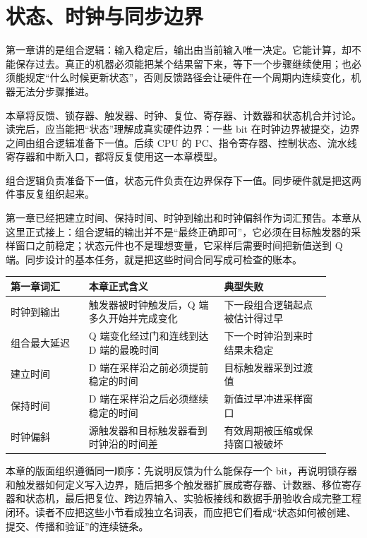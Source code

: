 \chapter{状态、时钟与同步边界}

第一章讲的是组合逻辑：输入稳定后，输出由当前输入唯一决定。它能计算，却不能保存过去。真正的机器必须能把某个结果留下来，等下一个步骤继续使用；也必须能规定“什么时候更新状态”，否则反馈路径会让硬件在一个周期内连续变化，机器无法分步骤推进。

本章将反馈、锁存器、触发器、时钟、复位、寄存器、计数器和状态机合并讨论。读完后，应当能把“状态”理解成真实硬件边界：一些 bit 在时钟边界被提交，边界之间由组合逻辑准备下一值。后续 CPU 的 PC、指令寄存器、控制状态、流水线寄存器和中断入口，都将反复使用这一本章模型。

\begin{keyidea}
组合逻辑负责准备下一值，状态元件负责在边界保存下一值。同步硬件就是把这两件事反复组织起来。
\end{keyidea}

第一章已经把建立时间、保持时间、时钟到输出和时钟偏斜作为词汇预告。本章从这里正式接上：组合逻辑的输出并不是“最终正确即可”，它必须在目标触发器的采样窗口之前稳定；状态元件也不是理想变量，它采样后需要时间把新值送到 Q 端。同步设计的基本任务，就是把这些时间合同写成可检查的账本。

\begin{longtable}{L{0.22\linewidth}L{0.38\linewidth}L{0.3\linewidth}}
\toprule
第一章词汇 & 本章正式含义 & 典型失败 \\
\midrule
时钟到输出 & 触发器被时钟触发后，Q 端多久开始并完成变化 & 下一段组合逻辑起点被估计得过早 \\
组合最大延迟 & Q 端变化经过门和连线到达 D 端的最晚时间 & 下一个时钟沿到来时结果未稳定 \\
建立时间 & D 端在采样沿之前必须提前稳定的时间 & 目标触发器采到过渡值 \\
保持时间 & D 端在采样沿之后必须继续稳定的时间 & 新值过早冲进采样窗口 \\
时钟偏斜 & 源触发器和目标触发器看到时钟沿的时间差 & 有效周期被压缩或保持窗口被破坏 \\
\bottomrule
\end{longtable}

本章的版面组织遵循同一顺序：先说明反馈为什么能保存一个 bit，再说明锁存器和触发器如何定义写入边界，随后把多个触发器扩展成寄存器、计数器、移位寄存器和状态机，最后把复位、跨边界输入、实验板接线和数据手册验收合成完整工程闭环。读者不应把这些小节看成独立名词表，而应把它们看成“状态如何被创建、提交、传播和验证”的连续链条。

